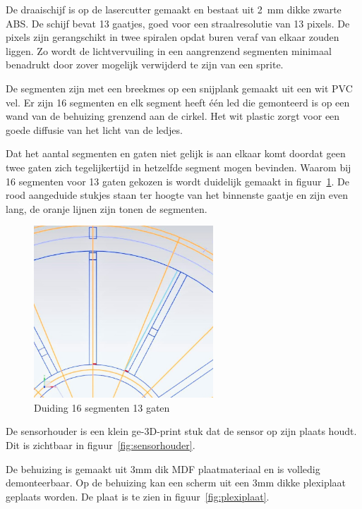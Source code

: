 \documentclass[12pt]{ugentreport}
\begin{document}
De draaischijf is op de lasercutter gemaakt en bestaat uit \SI{2}{\milli\meter} dikke zwarte ABS.
De schijf bevat 13 gaatjes, goed voor een straalresolutie van 13 pixels. De pixels
zijn gerangschikt in twee spiralen opdat buren veraf van elkaar zouden liggen. Zo
wordt de lichtvervuiling in een aangrenzend segmenten minimaal benadrukt door
zover mogelijk verwijderd te zijn van een sprite.

De segmenten zijn met een breekmes op een snijplank gemaakt uit een wit PVC vel.
Er zijn 16 segmenten en elk segment heeft één led die gemonteerd is op een wand
van de behuizing grenzend aan de cirkel. Het wit plastic zorgt voor een goede
diffusie van het licht van de ledjes.

Dat het aantal segmenten en gaten niet gelijk is aan elkaar komt doordat geen
twee gaten zich tegelijkertijd in hetzelfde segment mogen bevinden. Waarom bij
16 segmenten voor 13 gaten gekozen is wordt duidelijk gemaakt in figuur~\ref{fig:duiding1316}. De
rood aangeduide stukjes staan ter hoogte van het binnenste gaatje en zijn even
lang, de oranje lijnen zijn tonen de segmenten.

\begin{figure}
  \centering
  \includegraphics[width=0.6\textwidth]{img/16vs13.jpg}
  \caption{Duiding 16 segmenten 13 gaten}
  \label{fig:duiding1316}
\end{figure}

De sensorhouder is een klein ge-3D-print stuk dat de sensor op zijn plaats
houdt. Dit is zichtbaar in figuur~\ref{fig:sensorhouder}.

De behuizing is gemaakt uit 3mm dik MDF plaatmateriaal en is volledig demonteerbaar.
Op de behuizing kan een scherm uit een 3mm dikke plexiplaat geplaats worden. De plaat is te zien in figuur~\ref{fig:plexiplaat}.
\end{document}
